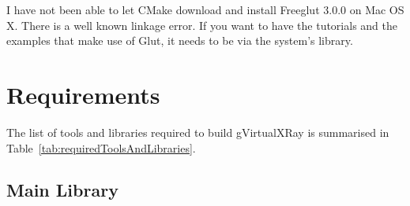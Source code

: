 \documentclass[11pt,oneside,a4paper,final]{article}
\begin{document}
I have not been able to let CMake download and install Freeglut 3.0.0 on Mac OS X. 
There is a well known linkage error. 
If you want to have the tutorials and the examples that make use of Glut, it needs to be via the system's library. 

%    
%









\section{Requirements}

The list of tools and libraries required to build gVirtualXRay is summarised in Table~\ref{tab:requiredToolsAndLibraries}.

\subsection{Main Library}
\end{document}
